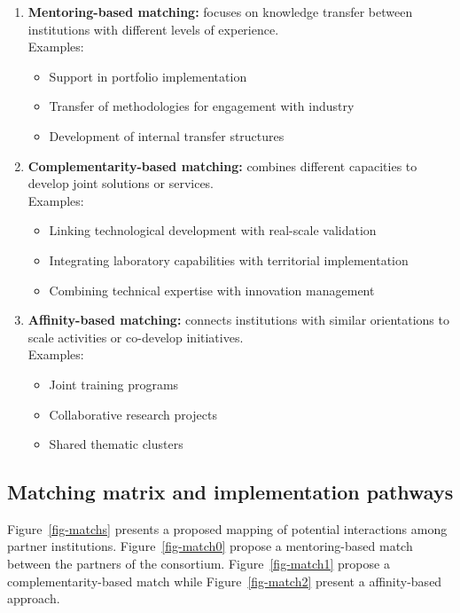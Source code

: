 \documentclass[
  12pt,
  oneside]{book}
\providecommand{\tightlist}{%
  \setlength{\itemsep}{0pt}\setlength{\parskip}{0pt}}
\begin{document}
\begin{enumerate}
\def\labelenumi{\arabic{enumi}.}
\item
  \textbf{Mentoring-based matching: }focuses on knowledge transfer
  between institutions with different levels of experience.\\
  Examples:

  \begin{itemize}
  \tightlist
  \item
    Support in portfolio implementation
  \item
    Transfer of methodologies for engagement with industry
  \item
    Development of internal transfer structures
  \end{itemize}
\item
  \textbf{Complementarity-based matching: }combines different capacities
  to develop joint solutions or services.\\
  Examples:

  \begin{itemize}
  \tightlist
  \item
    Linking technological development with real-scale validation
  \item
    Integrating laboratory capabilities with territorial implementation
  \item
    Combining technical expertise with innovation management
  \end{itemize}
\item
  \textbf{Affinity-based matching:} connects institutions with similar
  orientations to scale activities or co-develop initiatives.\\
  Examples:

  \begin{itemize}
  \tightlist
  \item
    Joint training programs
  \item
    Collaborative research projects
  \item
    Shared thematic clusters
  \end{itemize}
\end{enumerate}

\subsection{Matching matrix and implementation
pathways}\label{matching-matrix-and-implementation-pathways}

Figure~\ref{fig-matchs} presents a proposed mapping of potential
interactions among partner institutions. Figure~\ref{fig-match0} propose
a mentoring-based match between the partners of the consortium.
Figure~\ref{fig-match1} propose a complementarity-based match while
Figure~\ref{fig-match2} present a affinity-based approach.
\end{document}
